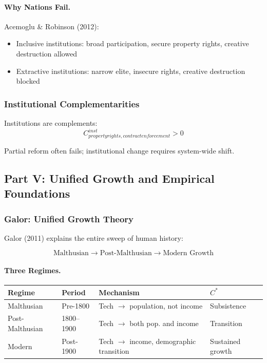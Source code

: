\paragraph{Why Nations Fail.}
Acemoglu \& Robinson (2012):
\begin{itemize}
    \item Inclusive institutions: broad participation, secure property rights, creative destruction allowed
    \item Extractive institutions: narrow elite, insecure rights, creative destruction blocked
\end{itemize}

\subsubsection{Institutional Complementarities}

Institutions are complements:
\begin{equation}
C_{property rights, contract enforcement}^{inst} > 0
\end{equation}

Partial reform often fails; institutional change requires system-wide shift.

\subsection{Part V: Unified Growth and Empirical Foundations}

\subsubsection{Galor: Unified Growth Theory}

Galor (2011) explains the entire sweep of human history:

\begin{equation}
\boxed{
\text{Malthusian} \to \text{Post-Malthusian} \to \text{Modern Growth}
}
\label{eq:galor}
\end{equation}

\paragraph{Three Regimes.}
\begin{center}
\renewcommand{\arraystretch}{1.3}
\begin{tabular}{|l|l|l|l|}
\hline
\textbf{Regime} & \textbf{Period} & \textbf{Mechanism} & \textbf{$C^*$} \\
\hline
Malthusian & Pre-1800 & Tech $\to$ population, not income & Subsistence \\
Post-Malthusian & 1800--1900 & Tech $\to$ both pop. and income & Transition \\
Modern & Post-1900 & Tech $\to$ income, demographic transition & Sustained growth \\
\hline
\end{tabular}
\end{center}

